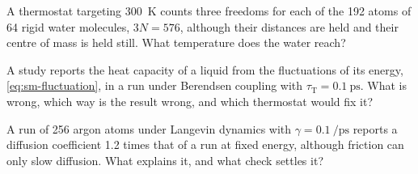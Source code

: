 \begin{exercise}
\label{ex:th-water}
A thermostat targeting \SI{300}{\kelvin} counts three freedoms for each of
the 192 atoms of 64 rigid water molecules, $3N = 576$, although their
distances are held and their centre of mass is held still. What temperature does the
water reach?
\end{exercise}

\begin{exercise}
\label{ex:th-referee}
A study reports the heat capacity of a liquid from the fluctuations of its
energy, \cref{eq:sm-fluctuation}, in a run under Berendsen coupling with
$\tau_{\mathrm T} = \SI{0.1}{\pico\second}$. What is wrong, which way is
the result wrong, and which thermostat would fix it?
\end{exercise}

\begin{exercise}[a diagnosis]
\label{ex:th-diagnose}
A run of 256 argon atoms under Langevin dynamics with $\gamma =
\SI{0.1}{\per\pico\second}$ reports a diffusion coefficient 1.2 times
that of a run at fixed energy, although friction can only slow
diffusion. What explains it, and what check settles it?
\end{exercise}
